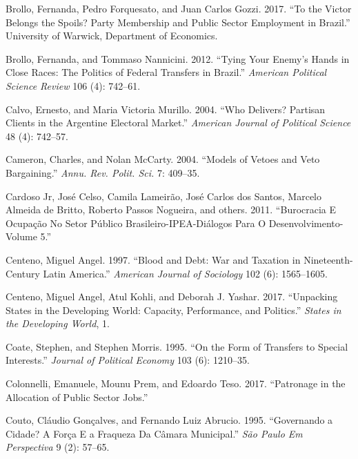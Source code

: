 \documentclass[12pt,]{article}
\begin{document}
\leavevmode\hypertarget{ref-brollo_victor_2017}{}%
Brollo, Fernanda, Pedro Forquesato, and Juan Carlos Gozzi. 2017. ``To
the Victor Belongs the Spoils? Party Membership and Public Sector
Employment in Brazil.'' University of Warwick, Department of Economics.

\leavevmode\hypertarget{ref-brollo_tying_2012}{}%
Brollo, Fernanda, and Tommaso Nannicini. 2012. ``Tying Your Enemy's
Hands in Close Races: The Politics of Federal Transfers in Brazil.''
\emph{American Political Science Review} 106 (4): 742--61.

\leavevmode\hypertarget{ref-calvo_who_2004}{}%
Calvo, Ernesto, and Maria Victoria Murillo. 2004. ``Who Delivers?
Partisan Clients in the Argentine Electoral Market.'' \emph{American
Journal of Political Science} 48 (4): 742--57.

\leavevmode\hypertarget{ref-cameron_models_2004}{}%
Cameron, Charles, and Nolan McCarty. 2004. ``Models of Vetoes and Veto
Bargaining.'' \emph{Annu. Rev. Polit. Sci.} 7: 409--35.

\leavevmode\hypertarget{ref-cardoso_jr_burocracia_2011}{}%
Cardoso Jr, José Celso, Camila Lameirão, José Carlos dos Santos, Marcelo
Almeida de Britto, Roberto Passos Nogueira, and others. 2011.
``Burocracia E Ocupação No Setor Público Brasileiro-IPEA-Diálogos Para O
Desenvolvimento-Volume 5.''

\leavevmode\hypertarget{ref-centeno_blood_1997}{}%
Centeno, Miguel Angel. 1997. ``Blood and Debt: War and Taxation in
Nineteenth-Century Latin America.'' \emph{American Journal of Sociology}
102 (6): 1565--1605.

\leavevmode\hypertarget{ref-centeno_unpacking_2017}{}%
Centeno, Miguel Angel, Atul Kohli, and Deborah J. Yashar. 2017.
``Unpacking States in the Developing World: Capacity, Performance, and
Politics.'' \emph{States in the Developing World}, 1.

\leavevmode\hypertarget{ref-coate_form_1995}{}%
Coate, Stephen, and Stephen Morris. 1995. ``On the Form of Transfers to
Special Interests.'' \emph{Journal of Political Economy} 103 (6):
1210--35.

\leavevmode\hypertarget{ref-colonnelli_patronage_2017}{}%
Colonnelli, Emanuele, Mounu Prem, and Edoardo Teso. 2017. ``Patronage in
the Allocation of Public Sector Jobs.''

\leavevmode\hypertarget{ref-couto_governando_1995}{}%
Couto, Cláudio Gonçalves, and Fernando Luiz Abrucio. 1995. ``Governando
a Cidade? A Força E a Fraqueza Da Câmara Municipal.'' \emph{São Paulo Em
Perspectiva} 9 (2): 57--65.
\end{document}
